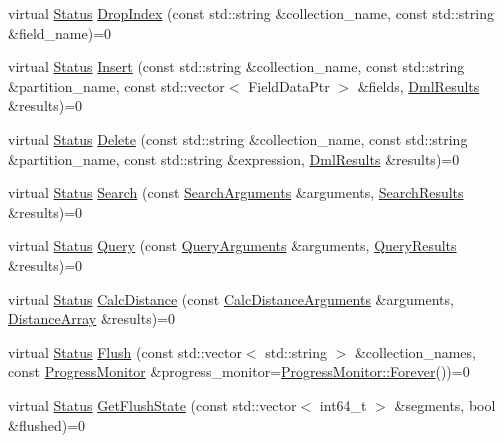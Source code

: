 \begin{DoxyCompactItemize}
\item 
virtual \hyperlink{classmilvus_1_1_status}{Status} \hyperlink{classmilvus_1_1_milvus_client_a1fd3b1c60f159cf5c0cc64bde567dd2d}{Drop\+Index} (const std\+::string \&collection\+\_\+name, const std\+::string \&field\+\_\+name)=0
\item 
virtual \hyperlink{classmilvus_1_1_status}{Status} \hyperlink{classmilvus_1_1_milvus_client_a64a2dca576e0933571a6889910d56390}{Insert} (const std\+::string \&collection\+\_\+name, const std\+::string \&partition\+\_\+name, const std\+::vector$<$ Field\+Data\+Ptr $>$ \&fields, \hyperlink{classmilvus_1_1_dml_results}{Dml\+Results} \&results)=0
\item 
virtual \hyperlink{classmilvus_1_1_status}{Status} \hyperlink{classmilvus_1_1_milvus_client_a271b16333636621f24aaf89993c72301}{Delete} (const std\+::string \&collection\+\_\+name, const std\+::string \&partition\+\_\+name, const std\+::string \&expression, \hyperlink{classmilvus_1_1_dml_results}{Dml\+Results} \&results)=0
\item 
virtual \hyperlink{classmilvus_1_1_status}{Status} \hyperlink{classmilvus_1_1_milvus_client_a46c70fc2b7c386003babd90e02b299d1}{Search} (const \hyperlink{classmilvus_1_1_search_arguments}{Search\+Arguments} \&arguments, \hyperlink{classmilvus_1_1_search_results}{Search\+Results} \&results)=0
\item 
virtual \hyperlink{classmilvus_1_1_status}{Status} \hyperlink{classmilvus_1_1_milvus_client_a2c27e3b681313329ccf491867d717182}{Query} (const \hyperlink{classmilvus_1_1_query_arguments}{Query\+Arguments} \&arguments, \hyperlink{classmilvus_1_1_query_results}{Query\+Results} \&results)=0
\item 
virtual \hyperlink{classmilvus_1_1_status}{Status} \hyperlink{classmilvus_1_1_milvus_client_a105c243c7d93ff2cd81b4d9c1751f5fb}{Calc\+Distance} (const \hyperlink{classmilvus_1_1_calc_distance_arguments}{Calc\+Distance\+Arguments} \&arguments, \hyperlink{classmilvus_1_1_distance_array}{Distance\+Array} \&results)=0
\item 
virtual \hyperlink{classmilvus_1_1_status}{Status} \hyperlink{classmilvus_1_1_milvus_client_ada4afa4d852dce6a8e8bffc112816276}{Flush} (const std\+::vector$<$ std\+::string $>$ \&collection\+\_\+names, const \hyperlink{classmilvus_1_1_progress_monitor}{Progress\+Monitor} \&progress\+\_\+monitor=\hyperlink{classmilvus_1_1_progress_monitor_afad65b07af8419780f2457992ee7ce7d}{Progress\+Monitor\+::\+Forever}())=0
\item 
virtual \hyperlink{classmilvus_1_1_status}{Status} \hyperlink{classmilvus_1_1_milvus_client_a0feac35352d6877ed620e428f609023b}{Get\+Flush\+State} (const std\+::vector$<$ int64\+\_\+t $>$ \&segments, bool \&flushed)=0

\end{DoxyCompactItemize}
